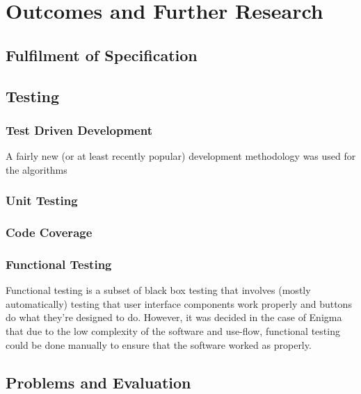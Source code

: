 
\chapter{Outcomes and Further Research} 
\label{Chapter8}

\section{Fulfilment of Specification}



\section{Testing}



\subsection{Test Driven Development}

A fairly new (or at least recently popular) development methodology was used for the algorithms 

\subsection{Unit Testing}



\subsection{Code Coverage}



\subsection{Functional Testing}

Functional testing is a subset of black box testing that involves (mostly automatically) testing that user interface components work properly and buttons do what they're designed to do. However, it was decided in the case of Enigma that due to the low complexity of the software and use-flow, functional testing could be done manually to ensure that the software worked as properly.

\section{Problems and Evaluation}
\label{sec:probs}

